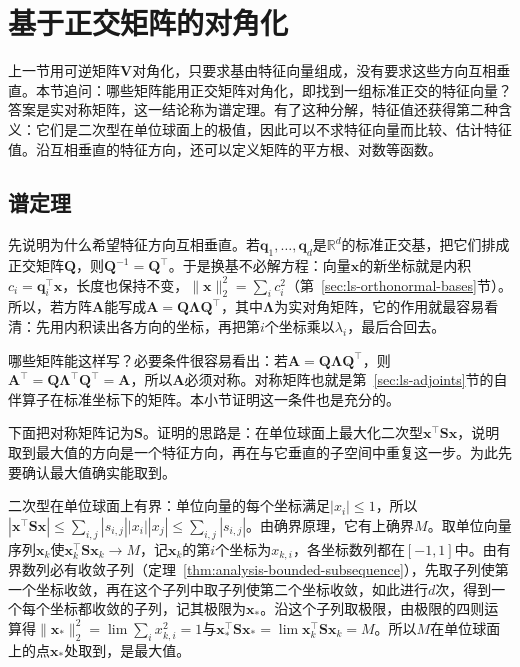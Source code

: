 
\section{基于正交矩阵的对角化}
\label{sec:ls-spectral-theory}

上一节用可逆矩阵$\bm V$对角化，只要求基由特征向量组成，没有要求这些方向互相垂直。本节追问：哪些矩阵能用正交矩阵对角化，即找到一组标准正交的特征向量？答案是实对称矩阵，这一结论称为谱定理。有了这种分解，特征值还获得第二种含义：它们是二次型在单位球面上的极值，因此可以不求特征向量而比较、估计特征值。沿互相垂直的特征方向，还可以定义矩阵的平方根、对数等函数。

\subsection{谱定理}
\label{sec:ls-symmetric-spectral-decomposition}

先说明为什么希望特征方向互相垂直。若$\bm q_1,\ldots,\bm q_d$是$\mathbb R^d$的标准正交基，把它们排成正交矩阵$\bm Q$，则$\bm Q^{-1}=\bm Q^\top$。于是换基不必解方程：向量$\bm x$的新坐标就是内积$c_i=\bm q_i^\top\bm x$，长度也保持不变，$\lVert\bm x\rVert_2^2=\sum_ic_i^2$（第~\ref{sec:ls-orthonormal-bases}节）。所以，若方阵$\bm A$能写成$\bm A=\bm Q\bm\Lambda\bm Q^\top$，其中$\bm\Lambda$为实对角矩阵，它的作用就最容易看清：先用内积读出各方向的坐标，再把第$i$个坐标乘以$\lambda_i$，最后合回去。

哪些矩阵能这样写？必要条件很容易看出：若$\bm A=\bm Q\bm\Lambda\bm Q^\top$，则$\bm A^\top=\bm Q\bm\Lambda^\top\bm Q^\top=\bm A$，所以$\bm A$必须对称。对称矩阵也就是第~\ref{sec:ls-adjoints}节的自伴算子在标准坐标下的矩阵。本小节证明这一条件也是充分的。

下面把对称矩阵记为$\bm S$。证明的思路是：在单位球面上最大化二次型$\bm x^\top\bm S\bm x$，说明取到最大值的方向是一个特征方向，再在与它垂直的子空间中重复这一步。为此先要确认最大值确实能取到。

二次型在单位球面上有界：单位向量的每个坐标满足$|x_i|\leq1$，所以$|\bm x^\top\bm S\bm x|\leq\sum_{i,j}|s_{i,j}||x_i||x_j|\leq\sum_{i,j}|s_{i,j}|$。由确界原理，它有上确界$M$。取单位向量序列$\bm x_k$使$\bm x_k^\top\bm S\bm x_k\to M$，记$\bm x_k$的第$i$个坐标为$x_{k,i}$，各坐标数列都在$[-1,1]$中。由有界数列必有收敛子列（定理~\ref{thm:analysis-bounded-subsequence}），先取子列使第一个坐标收敛，再在这个子列中取子列使第二个坐标收敛，如此进行$d$次，得到一个每个坐标都收敛的子列，记其极限为$\bm x_*$。沿这个子列取极限，由极限的四则运算得$\lVert\bm x_*\rVert_2^2=\lim\sum_ix_{k,i}^2=1$与$\bm x_*^\top\bm S\bm x_*=\lim\bm x_k^\top\bm S\bm x_k=M$。所以$M$在单位球面上的点$\bm x_*$处取到，是最大值。

